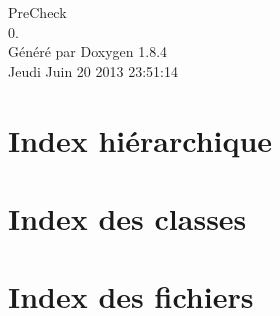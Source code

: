 \documentclass[twoside]{book}
\newcommand{\clearemptydoublepage}{%
  \newpage{\pagestyle{empty}\cleardoublepage}%
}
\begin{document}
\hypersetup{pageanchor=false}
\begin{titlepage}
\vspace*{7cm}
\begin{center}%
{\Large Pre\-Check \\[1ex]\large 0. }\\
\vspace*{1cm}
{\large Généré par Doxygen 1.8.4}\\
\vspace*{0.5cm}
{\small Jeudi Juin 20 2013 23:51:14}\\
\end{center}
\end{titlepage}
\clearemptydoublepage
\tableofcontents
\clearemptydoublepage
{}
\hypersetup{pageanchor=true}

\chapter{Index hiérarchique}

\chapter{Index des classes}

\chapter{Index des fichiers}

\end{document}
